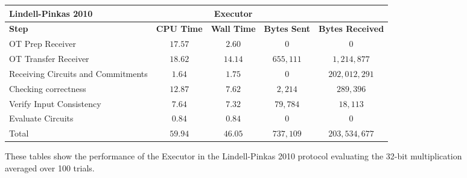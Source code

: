 \documentclass[ %
                    author={Nicholas Tutte},
                supervisor={Prof. Nigel Smart},
                    degree={MEng},
                     title={Secure Two Party Computation},
                  subtitle={A practical comparison of recent protocols},
                      type={Research - GG1K},
                      year={2015} ]{dissertation}
\begin{document}
				\begin{figure}
					\begin{tabular}{| p{3.5cm} | c c c c |}
						\hline
						\textbf{Lindell-Pinkas 2010} & & \textbf{Executor} & & \\
						\hline
						\textbf{Step} & \textbf{CPU Time} & \textbf{Wall Time} & \textbf{Bytes Sent} & \textbf{Bytes Received} \\
						\thickhline
						OT Prep Receiver & $17.57$ & $2.60$ & $0$ & $0$ \\
						\hline
						OT Transfer Receiver & $18.62$ & $14.14$ & $655,111$ & $1,214,877$ \\
						\hline
						Receiving Circuits and Commitments & $1.64$ & $1.75$ & $0$ & $202,012,291$ \\
						\hline
						Checking correctness & $12.87$ & $7.62$ & $2,214$ & $289,396$ \\
						\hline
						Verify Input Consistency & $7.64$ & $7.32$ & $79,784$ & $18,113$ \\
						\hline
						Evaluate Circuits & $0.84$ & $0.84$ & $0$ & $0$ \\
						\thickhline
						Total & $59.94$ & $46.05$ & $737,109$ & $203,534,677$ \\
						\hline
					\end{tabular}
					\caption{These tables show the performance of the Executor in the Lindell-Pinkas 2010 protocol evaluating the 32-bit multiplication averaged over 100 trials. \label{table:LP_2010_Mul_Executor}}
				\end{figure}
\end{document}
